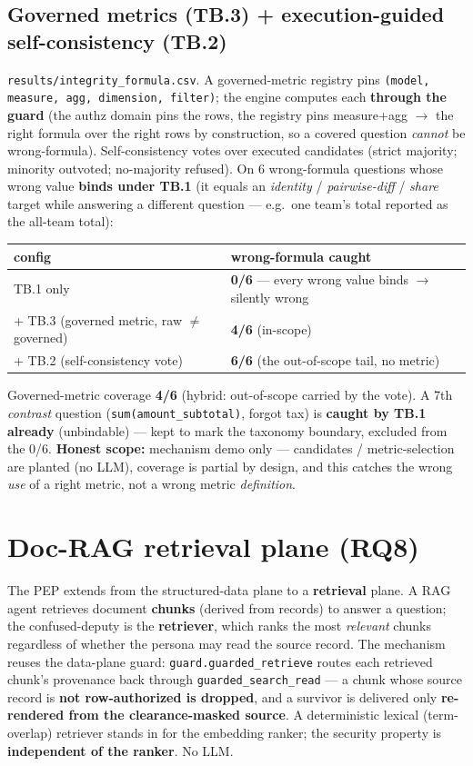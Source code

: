 \documentclass[11pt,a4paper]{article}
\newcommand{\code}[1]{\texttt{#1}}
\begin{document}
\subsection{Governed metrics (TB.3) + execution-guided self-consistency (TB.2)}
\code{results/integrity_formula.csv}. A governed-metric registry pins \code{(model, measure, agg, dimension,
filter)}; the engine computes each \textbf{through the guard} (the authz domain pins the rows, the registry
pins measure+agg $\to$ the right formula over the right rows by construction, so a covered question
\emph{cannot} be wrong-formula). Self-consistency votes over executed candidates (strict majority; minority
outvoted; no-majority refused). On 6 wrong-formula questions whose wrong value \textbf{binds under TB.1} (it
equals an \emph{identity} / \emph{pairwise-diff} / \emph{share} target while answering a different question ---
e.g.\ one team's total reported as the all-team total):

\begin{center}\small
\begin{tabular}{@{}ll@{}}
\toprule
config & wrong-formula caught \\
\midrule
TB.1 only & \textbf{0/6} --- every wrong value binds $\to$ silently wrong \\
+ TB.3 (governed metric, raw $\neq$ governed) & \textbf{4/6} (in-scope) \\
+ TB.2 (self-consistency vote) & \textbf{6/6} (the out-of-scope tail, no metric) \\
\bottomrule
\end{tabular}
\end{center}

Governed-metric coverage \textbf{4/6} (hybrid: out-of-scope carried by the vote). A 7th \emph{contrast}
question (\code{sum(amount_subtotal)}, forgot tax) is \textbf{caught by TB.1 already} (unbindable) --- kept to
mark the taxonomy boundary, excluded from the 0/6. \textbf{Honest scope:} mechanism demo only --- candidates /
metric-selection are planted (no LLM), coverage is partial by design, and this catches the wrong \emph{use} of
a right metric, not a wrong metric \emph{definition}.

\section{Doc-RAG retrieval plane (RQ8)}
The PEP extends from the structured-data plane to a \textbf{retrieval} plane. A RAG agent retrieves document
\textbf{chunks} (derived from records) to answer a question; the confused-deputy is the \textbf{retriever},
which ranks the most \emph{relevant} chunks regardless of whether the persona may read the source record. The
mechanism reuses the data-plane guard: \code{guard.guarded_retrieve} routes each retrieved chunk's provenance
back through \code{guarded_search_read} --- a chunk whose source record is \textbf{not row-authorized is
dropped}, and a survivor is delivered only \textbf{re-rendered from the clearance-masked source}. A
deterministic lexical (term-overlap) retriever stands in for the embedding ranker; the security property is
\textbf{independent of the ranker}. No LLM.
\end{document}
